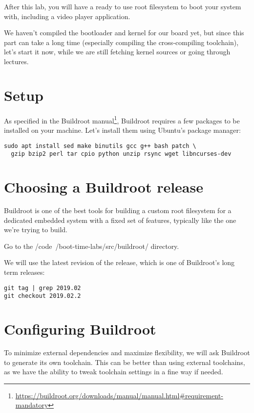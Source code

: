 
After this lab, you will have a ready to use root filesystem to boot
your system with, including a video player application.

We haven't compiled the bootloader and kernel for our board yet,
but since this part can take a long time (especially compiling the
cross-compiling toolchain), let's start it now, while we are still
fetching kernel sources or going through lectures.

\section{Setup}

As specified in the Buildroot
manual\footnote{\url{https://buildroot.org/downloads/manual/manual.html\#requirement-mandatory}},
Buildroot requires a few packages to be installed on your
machine. Let's install them using Ubuntu's package manager:

\begin{verbatim}
sudo apt install sed make binutils gcc g++ bash patch \
  gzip bzip2 perl tar cpio python unzip rsync wget libncurses-dev
\end{verbatim}

\section{Choosing a Buildroot release}

Buildroot is one of the best tools for building a custom root filesystem
for a dedicated embedded system with a fixed set of features, typically
like the one we're trying to build.

Go to the /code{~/boot-time-labs/src/buildroot/} directory.

We will use the latest revision of the  release, which is
one of Buildroot's long term releases:

\begin{verbatim}
git tag | grep 2019.02
git checkout 2019.02.2
\end{verbatim}

\section{Configuring Buildroot}

To minimize external dependencies and maximize flexibility, we will ask
Buildroot to generate its own toolchain. This can be better than using
external toolchains, as we have the ability to tweak toolchain settings
in a fine way if needed.

